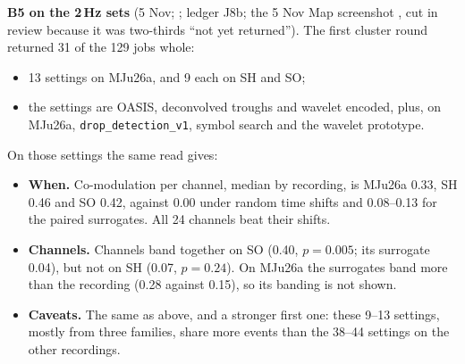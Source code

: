 \begin{instructions}
\textbf{B5 on the 2\,Hz sets} (5 Nov; ; ledger J8b;
the 5 Nov Map screenshot , cut in review because it was two-thirds
``not yet returned''). The first cluster round returned 31 of the 129 jobs whole:
\begin{itemize}
  \item 13 settings on MJu26a, and 9 each on SH and SO;
  \item the settings are OASIS, deconvolved troughs and wavelet encoded, plus, on MJu26a, \texttt{drop\_detection\_v1},
        symbol search and the wavelet prototype.
\end{itemize}
On those settings the same read gives:
\begin{itemize}
  \item \textbf{When.} Co-modulation per channel, median by recording, is MJu26a 0.33, SH 0.46 and SO 0.42, against
        0.00 under random time shifts and 0.08--0.13 for the paired surrogates. All 24 channels beat their shifts.
  \item \textbf{Channels.} Channels band together on SO (0.40, $p=0.005$; its surrogate 0.04), but not on SH (0.07,
        $p=0.24$). On MJu26a the surrogates band more than the recording (0.28 against 0.15), so its banding is not
        shown.
  \item \textbf{Caveats.} The same as above, and a stronger first one: these 9--13 settings, mostly from three
        families, share more events than the 38--44 settings on the other recordings.
\end{itemize}


\end{instructions}
